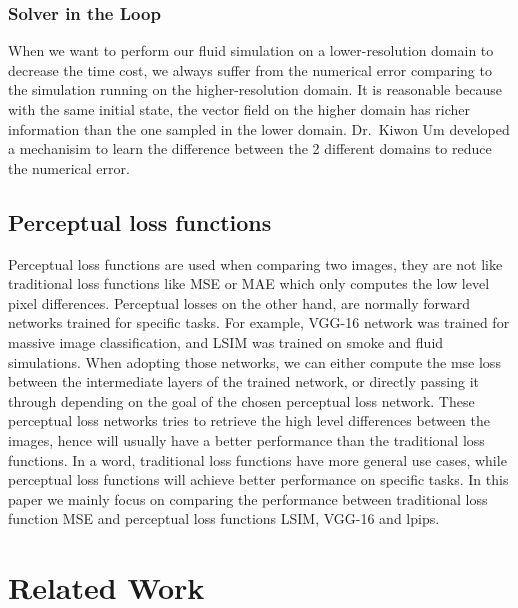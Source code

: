 \documentclass[a4paper,12pt,twoside]{report}
\begin{document}
\subsection{Solver in the Loop}
When we want to perform our fluid simulation on a lower-resolution domain to decrease the time cost, we always suffer from the numerical error comparing to the simulation running on the higher-resolution domain. It is reasonable because with the same initial state, the vector field on the higher domain has richer information than the one sampled in the lower domain. Dr.\ Kiwon Um\cite{um2020sol} developed a mechanisim to learn the difference between the 2 different domains to reduce the numerical error.

\section{Perceptual loss functions}
Perceptual loss functions are used when comparing two images, they are not like traditional loss functions like MSE or MAE which only computes the low level pixel differences. Perceptual losses on the other hand, are normally forward networks trained for specific tasks. For example, VGG-16 network was trained for massive image classification, and LSIM was trained on smoke and fluid simulations. When adopting those networks, we can either compute the mse loss between the intermediate layers of the trained network, or directly passing it through depending on the goal of the chosen perceptual loss network. These perceptual loss networks tries to retrieve the high level differences between the images, hence will usually have a better performance than the traditional loss functions. In a word, traditional loss functions have more general use cases, while perceptual loss functions will achieve better performance on specific tasks.
In this paper we mainly focus on comparing the performance between traditional loss function MSE and perceptual loss functions LSIM, VGG-16 and lpips.




\chapter{Related Work}
\end{document}
